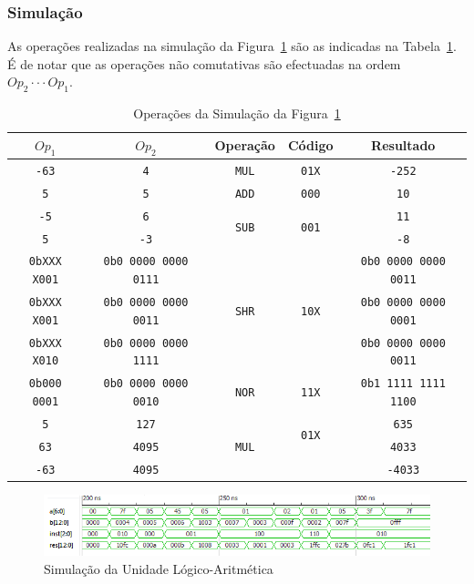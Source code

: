 \documentclass[a4paper]{article}
\begin{document}
\subsubsection{Simulação}
As operações realizadas na simulação da Figura~\ref{fig:ALUsim} são as indicadas na Tabela~\ref{tab:ALUsim}. É de notar que as operações não comutativas são efectuadas na ordem $ Op_2 \cdot \cdot \cdot Op_1 $.
\begin{table}[h]
	\begin{tabular}{|c | c || c | c | c|}
		\hline
		$Op_1$ & $Op_2$ & Operação & Código & Resultado \\
		\hline
		\texttt{-63} & \texttt{4} & \texttt{MUL} & \texttt{01X} & \texttt{-252} \\
		\hline
		\texttt{5} & \texttt{5} & \texttt{ADD} & \texttt{000} & \texttt{10} \\
		\hline
		\texttt{-5} & \texttt{6} & \multirow{2}{*}{\texttt{SUB}} & \multirow{2}{*}{\texttt{001}} & \texttt{11} \\
		\texttt{5} & \texttt{-3} & & & \texttt{-8} \\
		\hline
		\texttt{0bXXX X001} & \texttt{0b0 0000 0000 0111} & \multirow{3}{*}{\texttt{SHR}} & \multirow{3}{*}{\texttt{10X}} & \texttt{0b0 0000 0000 0011} \\
		\texttt{0bXXX X001} & \texttt{0b0 0000 0000 0011} & & & \texttt{0b0 0000 0000 0001} \\
		\texttt{0bXXX X010} & \texttt{0b0 0000 0000 1111} & & & \texttt{0b0 0000 0000 0011} \\
		\hline
		\texttt{0b000 0001} & \texttt{0b0 0000 0000 0010} & \texttt{NOR} & \texttt{11X} & \texttt{0b1 1111 1111 1100} \\
		\hline
		\texttt{5} & \texttt{127} & \multirow{3}{*}{\texttt{MUL}} & \multirow{2}{*}{\texttt{01X}} & \texttt{635} \\
		\texttt{63} & \texttt{4095} & & & \texttt{4033} \\
		\texttt{-63} & \texttt{4095} & & & \texttt{-4033} \\
		\hline
	\end{tabular}
	\caption{Operações da Simulação da Figura~\ref{fig:ALUsim}}
        \label{tab:ALUsim}
\end{table}

\begin{figure}[h]
	\centering
	\includegraphics[width=\textwidth]{ALU_sim}
	\caption{Simulação da Unidade Lógico-Aritmética}
	\label{fig:ALUsim}
\end{figure}
\pagebreak
\end{document}
